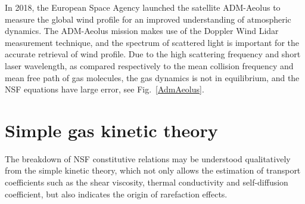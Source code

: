 
In 2018, the European Space Agency launched the satellite ADM-Aeolus to measure the global wind profile for an improved understanding of atmospheric dynamics. The ADM-Aeolus mission makes use of the Doppler Wind Lidar measurement technique, and the spectrum of scattered light is important for the accurate retrieval of wind profile. Due to the high scattering frequency and short laser wavelength, as compared respectively to the mean collision frequency and mean free path of gas molecules, the gas dynamics is not in equilibrium, and the NSF equations have large error, see Fig.~\ref{AdmAeolus}.



%	
%		
%		
%		






\section{Simple gas kinetic theory}\label{simple_kinetic_theory}

The breakdown of NSF constitutive relations may be understood qualitatively from the simple kinetic theory, which not only allows the estimation of transport coefficients  such as the shear viscosity, thermal conductivity and self-diffusion coefficient, but also indicates the origin of rarefaction effects. 

